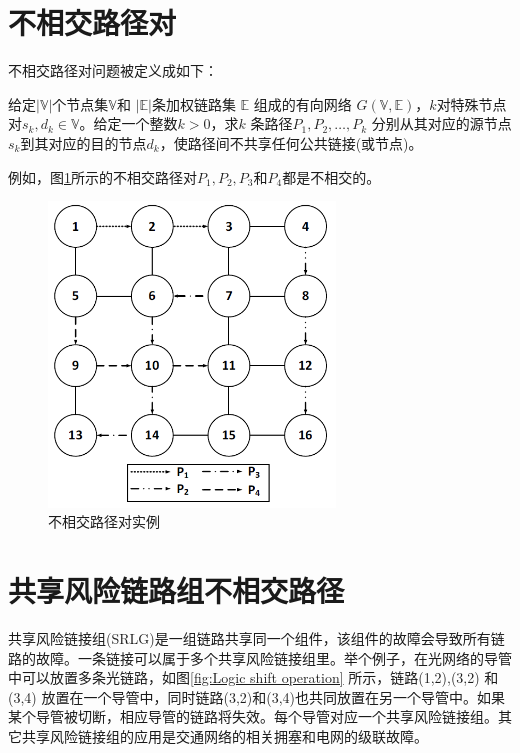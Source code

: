 \section{不相交路径对}
不相交路径对问题被定义成如下：

\begin{definition}[不相交路径对]
给定$|\mathbb{V}|$个节点集$\mathbb{V}$和 $|\mathbb{E}|$条加权链路集 $\mathbb{E}$ 组成的有向网络 $G(\mathbb{V},\mathbb{E})$，$k$对特殊节点对$s_k,d_k\in\mathbb{V}$。给定一个整数$k>0$，求$k$ 条路径$P_1,P_2,\ldots,P_k$ 分别从其对应的源节点$s_k$到其对应的目的节点$d_k$，使路径间不共享任何公共链接(或节点)。
\end{definition}
例如，图\ref{fig:DisjointPathPairs}所示的不相交路径对$P_1,P_2,P_3$和$P_4$都是不相交的。
\begin{figure}[htbp]
  \centering
  \includegraphics[width=3.0in]{figures/DisjointPathPairs}
  \caption{不相交路径对实例}
  \label{fig:DisjointPathPairs}
\end{figure}
\section{共享风险链路组不相交路径}

共享风险链接组(SRLG)是一组链路共享同一个组件，该组件的故障会导致所有链路的故障。一条链接可以属于多个共享风险链接组里。举个例子，在光网络的导管中\cite{bhandari1994optimal}可以放置多条光链路，如图\ref{fig:Logic shift operation} 所示，链路(1,2),(3,2) 和(3,4) 放置在一个导管中，同时链路(3,2)和(3,4)也共同放置在另一个导管中。如果某个导管被切断，相应导管的链路将失效。每个导管对应一个共享风险链接组。其它共享风险链接组的应用是交通网络的相关拥塞和电网的级联故障\cite{coudert2007shared}。


